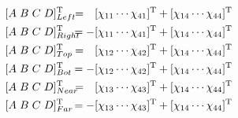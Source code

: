 \documentclass[a4paper,twoside]{article}
\begin{document}
\begin{align}
\nonumber %
&\lbrack A \hspace{3pt} B \hspace{3pt} C \hspace{3pt} D \rbrack^\mathrm{T}_{Left} \hspace{-15pt} &= \hspace{10pt}&\lbrack \chi_{11} \cdots \chi_{41} \rbrack^\mathrm{T} + \lbrack \chi_{14} \cdots \chi_{44} \rbrack^\mathrm{T}
\\
\nonumber %
&\lbrack A \hspace{3pt} B \hspace{3pt} C \hspace{3pt} D \rbrack^\mathrm{T}_{Right} \hspace{-15pt} &= -&\lbrack \chi_{11} \cdots \chi_{41} \rbrack^\mathrm{T} + \lbrack \chi_{14} \cdots \chi_{44} \rbrack^\mathrm{T}
\\
\nonumber %
&\lbrack A \hspace{3pt} B \hspace{3pt} C \hspace{3pt} D \rbrack^\mathrm{T}_{Top} \hspace{-15pt} &= \hspace{10pt}&\lbrack \chi_{12} \cdots \chi_{42} \rbrack^\mathrm{T} + \lbrack \chi_{14} \cdots \chi_{44} \rbrack^\mathrm{T}
\\
\nonumber %
&\lbrack A \hspace{3pt} B \hspace{3pt} C \hspace{3pt} D \rbrack^\mathrm{T}_{Bot} \hspace{-15pt} &= -&\lbrack \chi_{12} \cdots \chi_{42} \rbrack^\mathrm{T} + \lbrack \chi_{14} \cdots \chi_{44} \rbrack^\mathrm{T}
\\
\nonumber %
&\lbrack A \hspace{3pt} B \hspace{3pt} C \hspace{3pt} D \rbrack^\mathrm{T}_{Near} \hspace{-15pt} &= \hspace{10pt}&\lbrack \chi_{13} \cdots \chi_{43} \rbrack^\mathrm{T} + \lbrack \chi_{14} \cdots \chi_{44} \rbrack^\mathrm{T}
\\
\nonumber %
&\lbrack A \hspace{3pt} B \hspace{3pt} C \hspace{3pt} D \rbrack^\mathrm{T}_{Far} \hspace{-15pt} &= -&\lbrack \chi_{13} \cdots \chi_{43} \rbrack^\mathrm{T} + \lbrack \chi_{14} \cdots \chi_{44} \rbrack^\mathrm{T}
\\
\end{align}
\end{document}
